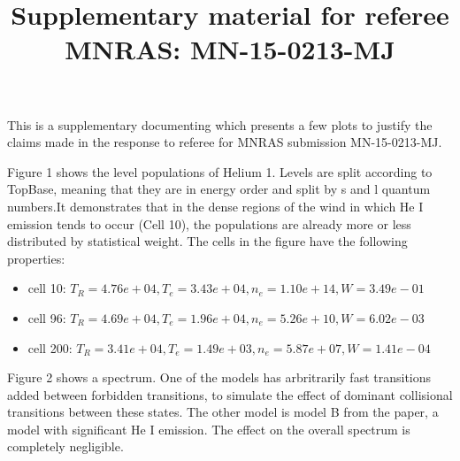 \documentclass{article}
\begin{document}
\title{Supplementary material for referee\\MNRAS: MN-15-0213-MJ}
\maketitle

This is a supplementary documenting which presents a few plots to justify the claims made in the response to
referee for MNRAS submission MN-15-0213-MJ.

Figure 1 shows the level populations of Helium 1. Levels are split according to TopBase, meaning that they are in 
energy order and split by s and l quantum numbers.It demonstrates that in the dense regions of the wind in which He I emission tends to occur (Cell 10), the populations are already more or less distributed by statistical weight. The cells in the figure have the following properties:

\begin{itemize}
\item cell 10: $T_R=4.76e+04, T_e=3.43e+04, n_e=1.10e+14, W=3.49e-01$
\item cell 96: $T_R=4.69e+04, T_e=1.96e+04, n_e=5.26e+10, W=6.02e-03$
\item cell 200: $T_R=3.41e+04, T_e=1.49e+03, n_e=5.87e+07, W=1.41e-04$
\end{itemize}
Figure 2 shows a spectrum. One of the models has arbritrarily fast transitions added between forbidden transitions,
to simulate the effect of dominant collisional transitions between these states. The other model is model B from the 
paper, a model with significant He I emission. The effect on the overall spectrum is completely negligible. 
\end{document}
